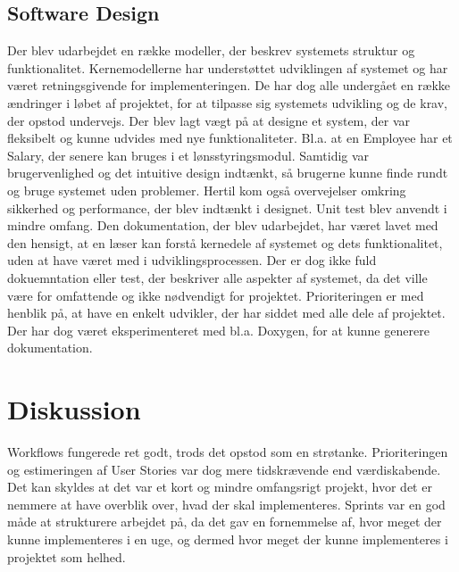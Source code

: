 \subsection{Software Design}
Der blev udarbejdet en række modeller, der beskrev systemets struktur og funktionalitet. Kernemodellerne har understøttet udviklingen af systemet og har været retningsgivende for implementeringen.
De har dog alle undergået en række ændringer i løbet af projektet, for at tilpasse sig systemets udvikling og de krav, der opstod undervejs.
Der blev lagt vægt på at designe et system, der var fleksibelt og kunne udvides med nye funktionaliteter. Bl.a. at en Employee har et Salary, der senere kan bruges i et lønsstyringsmodul.
Samtidig var brugervenlighed og det intuitive design indtænkt, så brugerne kunne finde rundt og bruge systemet uden problemer.
Hertil kom også overvejelser omkring sikkerhed og performance, der blev indtænkt i designet. Unit test blev anvendt i mindre omfang.
Den dokumentation, der blev udarbejdet, har været lavet med den hensigt, at en læser kan forstå kernedele af systemet og dets funktionalitet, uden at have været med i udviklingsprocessen.
Der er dog ikke fuld dokuemntation eller test, der beskriver alle aspekter af systemet, da det ville være for omfattende og ikke nødvendigt for projektet.
Prioriteringen er med henblik på, at have en enkelt udvikler, der har siddet med alle dele af projektet.
Der har dog været eksperimenteret med bl.a. Doxygen, for at kunne generere dokumentation.

\section{Diskussion}
\label{sec:conclusion_discussion}
Workflows fungerede ret godt, trods det opstod som en strøtanke. Prioriteringen og estimeringen af User Stories var dog mere tidskrævende end værdiskabende. 
Det kan skyldes at det var et kort og mindre omfangsrigt projekt, hvor det er nemmere at have overblik over, hvad der skal implementeres.
Sprints var en god måde at strukturere arbejdet på, da det gav en fornemmelse af, hvor meget der kunne implementeres i en uge, og dermed hvor meget der kunne implementeres i projektet som helhed.

